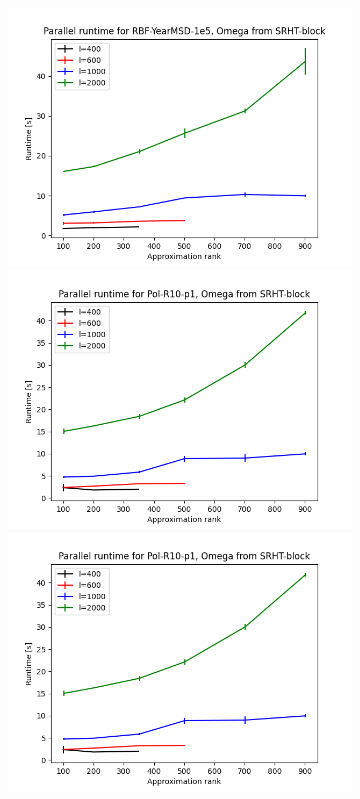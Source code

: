 \documentclass{article}
\theoremstyle{definition}
\begin{document}
\begin{figure}
\begin{subfigure}[t]{\textwidth+20pt\relax}
    \includegraphics[width=\dimexpr\linewidth-20pt\relax]{plots/runtime/runtime_par_RBF-YearMSD-1e5_SRHT-block.png}
    \includegraphics[width=\dimexpr\linewidth-20pt\relax]{plots/runtime/runtime_par_Pol-R10-p1_SRHT-block.png}
    \includegraphics[width=\dimexpr\linewidth-20pt\relax]{plots/runtime/runtime_par_Pol-R10-p1_SRHT-block.png}

\end{subfigure}
\end{figure}
\end{document}
